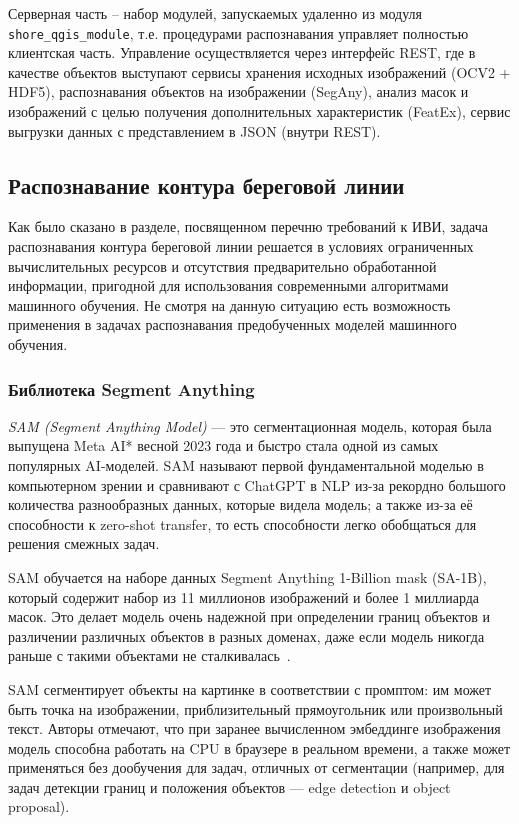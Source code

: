 \documentclass[732,fontsize=14pt,final]{studrep}
\begin{document}
Серверная часть -- набор модулей, запускаемых удаленно из модуля \verb|shore_qgis_module|, т.е. процедурами распознавания управляет полностью   клиентская часть. Управление осуществляется через интерфейс REST, где в качестве объектов выступают сервисы хранения исходных изображений (OCV2 + HDF5), распознавания объектов на изображении (SegAny), анализ масок и изображений с целью получения дополнительных характеристик (FeatEx), сервис выгрузки данных с представлением в JSON (внутри REST).

\subsection{Распознавание контура береговой линии}

Как было сказано в разделе, посвященном перечню требований к ИВИ, задача распознавания контура береговой линии решается в условиях ограниченных вычислительных ресурсов и отсутствия предварительно обработанной информации, пригодной для использования современными алгоритмами машинного обучения. Не смотря на данную ситуацию есть возможность применения в задачах распознавания предобученных моделей машинного обучения. 

\subsubsection{Библиотека Segment Anything}
\label{sec:sam}

\emph{SAM (Segment Anything Model)} — это сегментационная модель, которая была выпущена Meta AI*  весной 2023 года и быстро стала одной из самых популярных AI-моделей. SAM называют первой фундаментальной моделью в компьютерном зрении и сравнивают с ChatGPT в NLP из-за рекордно большого количества разнообразных данных, которые видела модель; а также из-за её способности к zero-shot transfer, то есть способности легко обобщаться для решения смежных задач.

SAM обучается на наборе данных Segment Anything 1-Billion mask (SA-1B), который содержит набор из 11 миллионов изображений и более 1 миллиарда масок. Это делает модель очень надежной при определении границ объектов и различении различных объектов в разных доменах, даже если модель никогда раньше с такими объектами не сталкивалась~\cite{samart}.

SAM сегментирует объекты на картинке в соответствии с промптом: им может быть точка на изображении, приблизительный прямоугольник или произвольный текст. Авторы отмечают, что при заранее вычисленном эмбеддинге изображения модель способна работать на CPU в браузере в реальном времени, а также может применяться без дообучения для задач, отличных от сегментации (например, для задач детекции границ и положения объектов — edge detection и object proposal).
\end{document}
